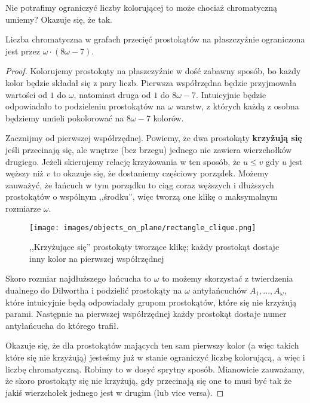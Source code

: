     Nie potrafimy ograniczyć liczby kolorującej to może chociaż chromatyczną umiemy? Okazuje się, że tak.
    \begin{theorem}
      Liczba chromatyczna w grafach przecięć prostokątów na płaszczyźnie ograniczona jest przez $\omega \cdot (8\omega - 7)$.
    \end{theorem}
    \begin{proof}
        Kolorujemy prostokąty na płaszczyźnie w dość zabawny sposób, bo każdy kolor będzie składał się z pary liczb. 
        Pierwsza współrzędna będzie przyjmowała wartości od $1$ do $\omega$, natomiast druga od $1$ do $8\omega - 7$.
        Intuicyjnie będzie odpowiadało to podzieleniu prostokątów na $\omega$ warstw, z których każdą z osobna będziemy umieli pokolorować na $8\omega - 7$ kolorów.
        
        Zacznijmy od pierwszej współrzędnej. 
        Powiemy, że dwa prostokąty \textbf{krzyżują się} jeśli przecinają się, ale wnętrze (bez brzegu) jednego nie zawiera wierzchołków drugiego.
        Jeżeli skierujemy relację krzyżowania w ten sposób, że
        $u \leq v$ gdy $u$ jest węższy niż $v$ to okazuje się, że dostaniemy częściowy porządek. 
        Możemy zauważyć, że łańcuch w tym porządku to ciąg coraz węższych i dłuższych prostokątów o wspólnym ,,środku'', więc tworzą one klikę o maksymalnym rozmiarze $\omega$.
        
       \begin{figure}[H]
            \centering
            \texttt{[image: images/objects\_on\_plane/rectangle\_clique.png]}
            \caption{,,Krzyżujące się'' prostokąty tworzące klikę; każdy prostokąt dostaje inny kolor na pierwszej współrzędnej}
        \end{figure}
        
        
        Skoro rozmiar najdłuższego łańcucha to $\omega$ to możemy skorzystać z twierdzenia dualnego do Dilwortha i podzielić prostokąty na $\omega$ antyłańcuchów $A_1, ..., A_\omega$,
        które intuicyjnie będą odpowiadały grupom prostokątów, które się nie krzyżują parami.
        Następnie na pierwszej współrzędnej każdy prostokąt dostaje numer antyłańcucha do którego trafił.
        
        Okazuje się, że dla prostokątów mających ten sam pierwszy kolor (a więc takich które się nie krzyżują) jesteśmy już w stanie ograniczyć liczbę kolorującą, a więc i liczbę chromatyczną. Robimy to w dosyć sprytny sposób.  Mianowicie zauważamy, że skoro prostokąty się nie krzyżują, gdy przecinają się one to musi być tak że jakiś wierzchołek jednego jest w drugim (lub vice versa).


\end{proof}
